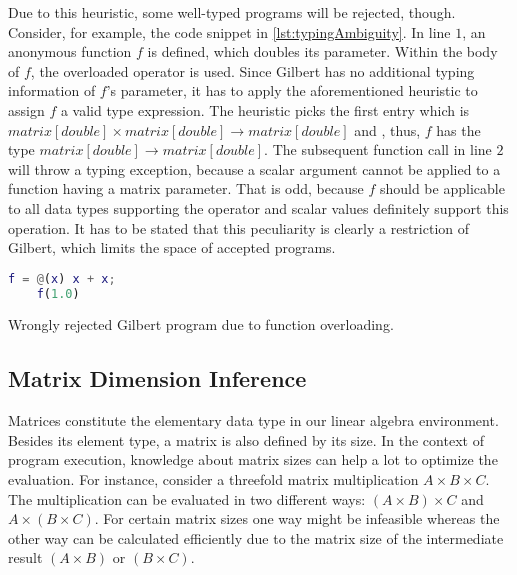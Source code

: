 Due to this heuristic, some well-typed programs will be rejected, though.
Consider, for example, the code snippet in \cref{lst:typingAmbiguity}.
In line $1$, an anonymous function $f$ is defined, which doubles its parameter.
Within the body of $f$, the overloaded \code{+} operator is used.
Since Gilbert has no additional typing information of $f$'s parameter, it has to apply the aforementioned heuristic to assign $f$ a valid type expression.
The heuristic picks the first entry which is $matrix[double] \times matrix[double] \rightarrow matrix[double]$ and , thus, $f$ has the type $matrix[double] \rightarrow matrix[double]$.
The subsequent function call  in line $2$ will throw a typing exception, because a scalar argument cannot be applied to a function having a matrix parameter.
That is odd, because $f$ should be applicable to all data types supporting the \code{+} operator and scalar values definitely support this operation.
It has to be stated that this peculiarity is clearly a restriction of Gilbert, which limits the space of accepted programs.

\begin{listing}[!h]
  \begin{CenteredBox}
    \begin{lstlisting}[language=Matlab]
    f = @(x) x + x;
    f(1.0)
    \end{lstlisting}
  \end{CenteredBox}
  \caption{Wrongly rejected Gilbert program due to function overloading.}
  \label{lst:typingAmbiguity}
\end{listing}

\subsection{Matrix Dimension Inference}
\label{sec:MatrixDimensionInference}

Matrices constitute the elementary data type in our linear algebra environment.
Besides its element type, a matrix is also defined by its size.
In the context of program execution, knowledge about matrix sizes can help a lot to optimize the evaluation.
For instance, consider a threefold matrix multiplication $A\times B\times C$.
The multiplication can be evaluated in two different ways: $(A\times B)\times C$ and $A\times(B\times C)$.
For certain matrix sizes one way might be infeasible whereas the other way can be calculated efficiently due to the matrix size of the intermediate result $(A\times B)$ or $(B\times C)$.

